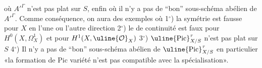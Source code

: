 où $A'^{\Gamma}$ n'est pas plat sur $S$, enfin où il n'y a pas de ``bon'' sous-schéma abélien de $A'^{\Gamma}$. Comme conséquence, on aura des exemples où 1$^\circ$) la symétrie est fausse pour $X$ en l'une ou l'autre direction 2$^\circ$) le  de continuité est faux pour $H^0(X,\Omega^1_X)$ et pour $H^1(X,\uline{\mathcal O}_X)$ 3$^\circ$) $\uline{\operatorname{Pic}}_{X/S}^{\tau}$ n'est pas plat sur $S$ 4$^\circ$) Il n'y a pas de ``bon'' sous-schéma abélien de $\uline{\operatorname{Pic}}_{X/S}^{\tau}$ en particulier «la formation de Pic variété n'est pas compatible avec la spécialisation».
